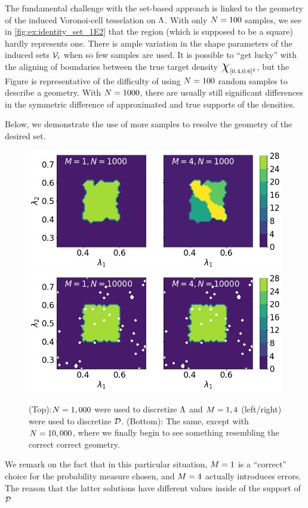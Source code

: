 The fundamental challenge with the set-based approach is linked to the geometry of the induced Voronoi-cell tesselation on ${\Lambda}$.
With only $N = 100$ samples, we see in \ref{fig:ex:identity_set_1E2} that the region (which is supposed to be a square) hardly represents one.
There is ample variation in the shape parameters of the induced sets $\mathcal{V}_i$ when so few samples are used.
It is possible to ``get lucky'' with the aligning of boundaries between the true target density $\Chi_{[0.4, 0.6]^2}$, but the Figure is representative of the difficulty of using $N = 100$ random samples to describe a geometry.
With $N = 1000$, there are usually still significant differences in the symmetric difference of approximated and true supports of the densities.

Below, we demonstrate the use of more samples to resolve the geometry of the desired set.
\begin{figure}[ht]
\begin{minipage}{.975\textwidth}
  \includegraphics[width=\linewidth]{./examples/identity/set/M1-N1000_N1000-vs-M4-N1000_N1000.png}
  \includegraphics[width=\linewidth]{./examples/identity/set/M1-N10000_N10000-vs-M4-N10000_N10000.png}
\end{minipage}
\caption{
(Top):$N=1,000$ were used to discretize ${\Lambda}$ and $M=1, 4$ (left/right) were used to discretize $\mathcal{D}$.
(Bottom): The same, except with $N=10,000$, where we finally begin to see something resembling the correct correct geometry.
}
\label{fig:ex:identity_set_1E3_1E4}
\end{figure}


We remark on the fact that in this particular situation, $M = 1$ is a ``correct'' choice for the probability measure chosen, and $M = 4$ actually introduces errors.
The reason that the latter solutions have different values inside of the support of $\mathcal{P}$
